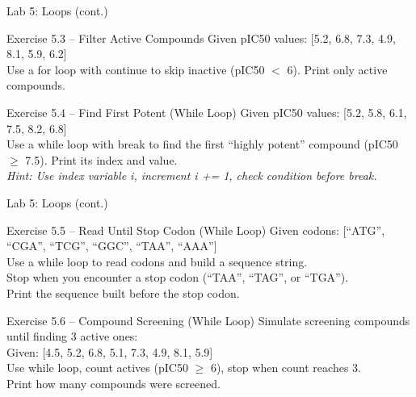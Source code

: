 \documentclass{beamer}
\begin{document}
\begin{frame}{\textcolor{labcolor}{Lab 5: Loops (cont.)}}
    \footnotesize
    \begin{block}{Exercise 5.3 -- Filter Active Compounds}
        Given pIC50 values: [5.2, 6.8, 7.3, 4.9, 8.1, 5.9, 6.2]\\
        Use a for loop with continue to skip inactive (pIC50 $<$ 6). Print only active compounds.
    \end{block}
    \vspace{0.2em}
    \begin{block}{Exercise 5.4 -- Find First Potent (While Loop)}
        Given pIC50 values: [5.2, 5.8, 6.1, 7.5, 8.2, 6.8]\\
        Use a while loop with break to find the first ``highly potent'' compound (pIC50 $\geq$ 7.5). Print its index and value.\\
        \textit{Hint: Use index variable i, increment i += 1, check condition before break.}
    \end{block}
\end{frame}

\begin{frame}{\textcolor{labcolor}{Lab 5: Loops (cont.)}}
    \footnotesize
    \begin{block}{Exercise 5.5 -- Read Until Stop Codon (While Loop)}
        Given codons: [``ATG'', ``CGA'', ``TCG'', ``GGC'', ``TAA'', ``AAA'']\\
        Use a while loop to read codons and build a sequence string.\\
        Stop when you encounter a stop codon (``TAA'', ``TAG'', or ``TGA'').\\
        Print the sequence built before the stop codon.
    \end{block}
    \vspace{0.2em}
    \begin{block}{Exercise 5.6 -- Compound Screening (While Loop)}
        Simulate screening compounds until finding 3 active ones:\\
        Given: [4.5, 5.2, 6.8, 5.1, 7.3, 4.9, 8.1, 5.9]\\
        Use while loop, count actives (pIC50 $\geq$ 6), stop when count reaches 3.\\
        Print how many compounds were screened.
    \end{block}
\end{frame}

\end{document}

